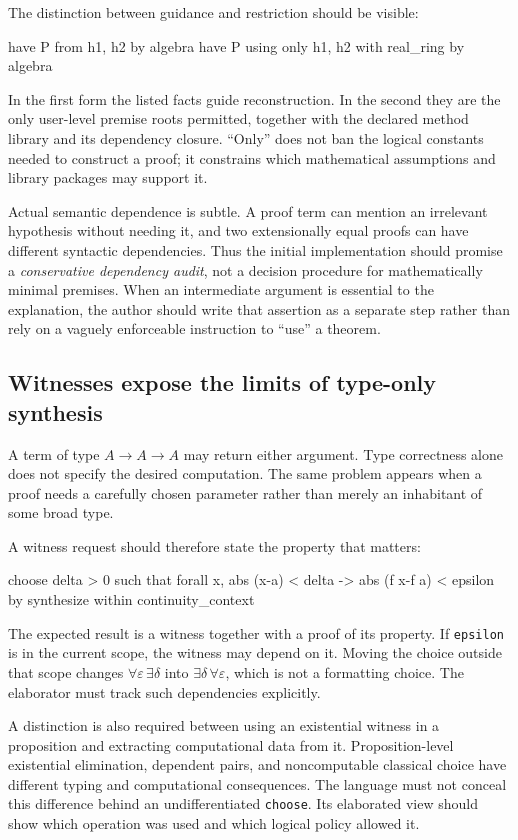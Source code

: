 \documentclass[11pt,a4paper]{article}
\theoremstyle{remark}
\newcommand{\ty}[1]{\texttt{#1}}
\begin{document}
The distinction between guidance and restriction should be visible:
\Needspace{46pt}
\begin{code}
have P from h1, h2 by algebra
have P using only h1, h2 with real_ring by algebra
\end{code}
In the first form the listed facts guide reconstruction. In the second they are the only user-level premise roots permitted, together with the declared method library and its dependency closure. ``Only'' does not ban the logical constants needed to construct a proof; it constrains which mathematical assumptions and library packages may support it.

Actual semantic dependence is subtle. A proof term can mention an irrelevant hypothesis without needing it, and two extensionally equal proofs can have different syntactic dependencies. Thus the initial implementation should promise a \emph{conservative dependency audit}, not a decision procedure for mathematically minimal premises. When an intermediate argument is essential to the explanation, the author should write that assertion as a separate step rather than rely on a vaguely enforceable instruction to ``use'' a theorem.

\subsection{Witnesses expose the limits of type-only synthesis}
A term of type $A\to A\to A$ may return either argument. Type correctness alone does not specify the desired computation. The same problem appears when a proof needs a carefully chosen parameter rather than merely an inhabitant of some broad type.

A witness request should therefore state the property that matters:
\Needspace{58pt}
\begin{code}
choose delta > 0 such that
  forall x, abs (x-a) < delta -> abs (f x-f a) < epsilon
by synthesize within continuity_context
\end{code}
The expected result is a witness together with a proof of its property. If \ty{epsilon} is in the current scope, the witness may depend on it. Moving the choice outside that scope changes $\forall\varepsilon\,\exists\delta$ into $\exists\delta\,\forall\varepsilon$, which is not a formatting choice. The elaborator must track such dependencies explicitly.

A distinction is also required between using an existential witness in a proposition and extracting computational data from it. Proposition-level existential elimination, dependent pairs, and noncomputable classical choice have different typing and computational consequences. The language must not conceal this difference behind an undifferentiated \ty{choose}. Its elaborated view should show which operation was used and which logical policy allowed it.
\end{document}

